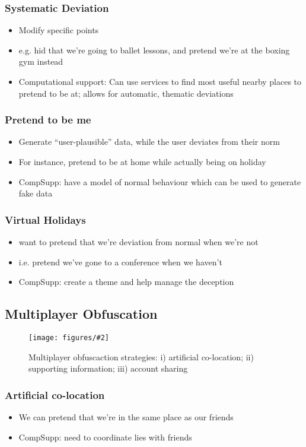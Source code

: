 \documentclass{IOS-Book-Article}     %
\newcommand{\fig}[3][0.9]{
\begin{figure}[tp]
\begin{center}
\texttt{[image: figures/\#2]}
\caption{#3}
\label{fig:#2}
\end{center}
\end{figure}
}
\begin{document}
\subsubsection{Systematic Deviation}
\begin{itemize}
  \item Modify specific points
  \item e.g. hid that we're going to ballet lessons, and pretend we're at the
  boxing gym instead
  \item Computational support: Can use services to find most useful nearby
  places to pretend to be at; allows for automatic, thematic deviations
\end{itemize}

\subsubsection{Pretend to be me}
\begin{itemize}
  \item Generate ``user-plausible'' data, while the user deviates from their
  norm
  \item For instance, pretend to be at home while actually being on holiday
  \item CompSupp: have a model of normal behaviour which can be used to generate
  fake data
\end{itemize}

\subsubsection{Virtual Holidays}
\begin{itemize}
  \item want to pretend that we're deviation from normal when we're not
  \item i.e. pretend we've gone to a conference when we haven't
  \item CompSupp: create a theme and help manage the deception
\end{itemize}

\subsection{Multiplayer Obfuscation}
\fig{MultiPlayerObfuscation}{Multiplayer obfuscaction strategies: i) artificial
co-location; ii) supporting information; iii) account sharing}

\subsubsection{Artificial co-location}
\begin{itemize}
  \item We can pretend that we're in the same place as our friends
  \item CompSupp: need to coordinate lies with friends
\end{itemize}
\end{document}
